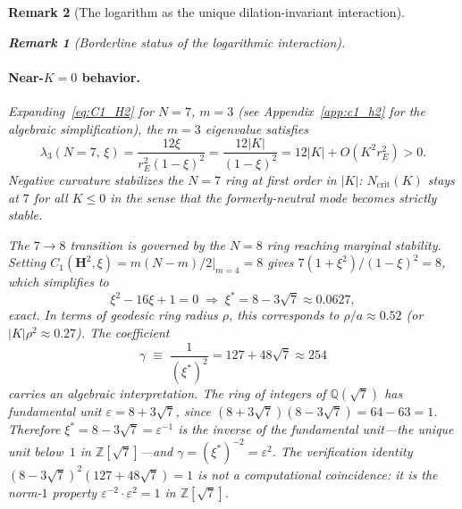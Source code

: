\documentclass[12pt, a4paper]{article}
\newtheorem{remark}{Remark}[section]
\numberwithin{equation}{section}
\begin{document}
\begin{remark}[The logarithm as the unique dilation-invariant interaction]
\begin{remark}[Borderline status of the logarithmic interaction]
\paragraph{Near-$K=0$ behavior.}
Expanding~\eqref{eq:C1_H2} for $N=7$, $m=3$ (see
Appendix~\ref{app:c1_h2} for the algebraic simplification), the
$m=3$ eigenvalue satisfies
\begin{equation}
  \lambda_3(N=7,\,\xi)
    = \frac{12\xi}{r_E^2(1-\xi)^2}
    = \frac{12|K|}{(1-\xi)^2}
    = 12|K| + O(K^2 r_E^2) > 0 .
  \label{eq:lam3_H2}
\end{equation}
Negative curvature stabilizes the $N=7$ ring at \emph{first} order in
$|K|$: $N_\mathrm{crit}(K)$ stays at $7$ for all $K \le 0$ in the
sense that the formerly-neutral mode becomes strictly stable.

The $7\to 8$ transition is governed by the $N=8$ ring reaching marginal
stability.  Setting $C_1(\mathbf{H}^2,\xi) = m(N{-}m)/2\big|_{m=4} = 8$
gives $7(1+\xi^2)/(1-\xi)^2 = 8$, which simplifies to
\begin{equation}
  \xi^2 - 16\xi + 1 = 0
  \;\Longrightarrow\;
  \xi^* = 8 - 3\sqrt{7} \approx 0.0627 ,
  \label{eq:xi_star}
\end{equation}
exact.  In terms of geodesic ring radius $\rho$, this corresponds to
$\rho/a \approx 0.52$ (or $|K|\rho^2 \approx 0.27$).
The coefficient
\begin{equation}
  \gamma \;\equiv\; \frac{1}{(\xi^*)^2} = 127 + 48\sqrt{7} \approx 254
  \label{eq:gamma}
\end{equation}
carries an algebraic interpretation.
The ring of integers of $\mathbb{Q}(\sqrt{7})$ has fundamental unit
$\varepsilon = 8 + 3\sqrt{7}$, since $(8+3\sqrt{7})(8-3\sqrt{7}) = 64-63 = 1$.
Therefore $\xi^* = 8-3\sqrt{7} = \varepsilon^{-1}$ is the
\emph{inverse of the fundamental unit}---the unique unit below~$1$
in $\mathbb{Z}[\sqrt{7}]$---and $\gamma = (\xi^*)^{-2} = \varepsilon^2$.
The verification identity $(8-3\sqrt{7})^2(127+48\sqrt{7})=1$ is not a
computational coincidence: it is the norm-$1$ property
$\varepsilon^{-2}\cdot\varepsilon^2=1$ in $\mathbb{Z}[\sqrt{7}]$.


\end{remark}
\end{remark}
\end{document}
